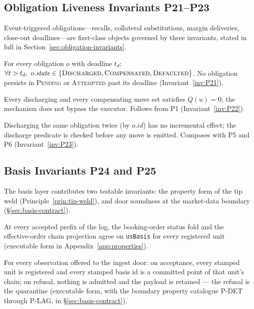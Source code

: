 \documentclass[11pt,a4paper]{article}
\begin{document}
\subsection{Obligation Liveness Invariants P21--P23}
\label{sec:invariants-obligation}

Event-triggered obligations\allowbreak---\allowbreak recalls, collateral substitutions, margin deliveries, close-out deadlines\allowbreak---\allowbreak are first-class objects governed by three invariants, stated in full in Section~\ref{sec:obligation-invariants}.

\begin{description}[leftmargin=3.2em,style=nextline]
\item[P21 Obligation liveness] For every obligation $o$ with deadline $t_d$: $\forall t>t_d,\ o.\mathit{state}\in\{\textsc{Discharged},\allowbreak\textsc{Compensated},\allowbreak\textsc{Defaulted}\}$. No obligation persists in \textsc{Pending} or \textsc{Attempted} past its deadline (Invariant~\ref{inv:P21}).
\item[P22 Obligation conservation] Every discharging and every compensating move set satisfies $Q(u)=0$; the mechanism does not bypass the executor. Follows from P1 (Invariant~\ref{inv:P22}).
\item[P23 Obligation idempotency] Discharging the same obligation twice (by $o.\mathit{id}$) has no incremental effect; the discharge predicate is checked before any move is emitted. Composes with P5 and P6 (Invariant~\ref{inv:P23}).
\end{description}

\subsection{Basis Invariants P24 and P25}
\label{sec:invariants-basis}

The basis layer contributes two testable invariants: the property form of the tip weld (Principle~\ref{prin:tip-weld}), and door soundness at the market-data boundary (\S\ref{sec:basis-contract}).

\begin{description}[leftmargin=3.2em,style=nextline]
\item[P24 Basis tip agreement]\label{inv:P24} At every accepted prefix of the log, the booking-order status fold and the effective-order chain projection agree on \texttt{usBasis} for every registered unit (executable form in Appendix~\ref{app:properties}).
\item[P25 Ingest-door soundness]\label{inv:P25} For every observation offered to the ingest door: on acceptance, every stamped unit is registered and every stamped basis id is a committed point of that unit's chain; on refusal, nothing is admitted and the payload is retained --- the refusal is the quarantine (executable form, with the boundary property catalogue P-DET through P-LAG, in \S\ref{sec:basis-contract}).
\end{description}
\end{document}
